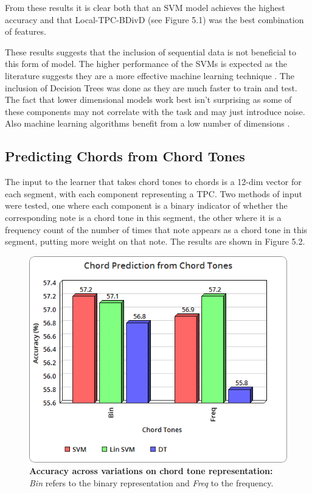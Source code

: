 \documentclass[bsc,singlespacing,parskip,deptreport,twoside,frontabs]{infthesis}
\begin{document}
From these results it is clear both that an SVM model achieves the highest accuracy and that Local-TPC-BDivD (see Figure 5.1) was the best combination of features.

These results suggests that the inclusion of sequential data is not beneficial to this form of model. The higher performance of the SVMs is expected as the literature suggests they are a more effective machine learning technique \cite[]{huang2003comparing}. The inclusion of Decision Trees was done as they are much faster to train and test. The fact that lower dimensional models work best isn't surprising as some of these components may not correlate with the task and may just introduce noise. Also machine learning algorithms benefit from a low number of dimensions \cite[]{cortes1995support}.

\subsection{Predicting Chords from Chord Tones}

The input to the learner that takes chord tones to chords is a 12-dim vector for each segment, with each component representing a TPC. Two methods of input were tested, one where each component is a binary indicator of whether the corresponding note is a chord tone in this segment, the other where it is a frequency count of the number of times that note appears as a chord tone in this segment, putting more weight on that note. The results are shown in Figure 5.2.

\begin{figure}
  \caption{\textbf{Accuracy across variations on chord tone representation:} \emph{Bin} refers to the binary representation and \emph{Freq} to the frequency.}
  \centering
    \includegraphics[scale=0.5]{ch}
\end{figure}
\end{document}
